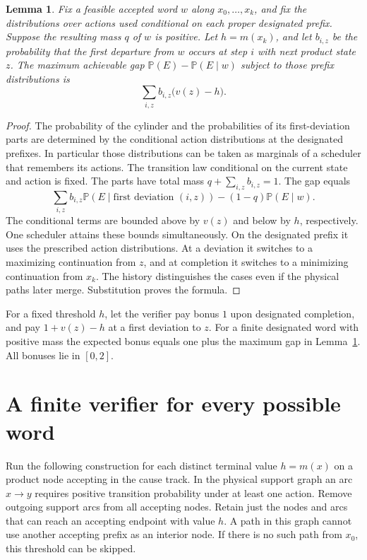 \documentclass[11pt,a4paper]{amsart}
\newtheorem{lemma}[theorem]{Lemma}
\newcommand{\Prb}{\mathbb P}
\begin{document}
\begin{lemma}\label{lem:gap}
Fix a feasible accepted word $w$ along $x_0,\ldots,x_k$, and fix the distributions over actions used conditional on each proper designated prefix. Suppose the resulting mass $q$ of $w$ is positive. Let $h=m(x_k)$, and let $b_{i,z}$ be the probability that the first departure from $w$ occurs at step $i$ with next product state $z$. The maximum achievable gap $\Prb(E)-\Prb(E\mid w)$ subject to those prefix distributions is
\[
                   \sum_{i,z} b_{i,z}\bigl(v(z)-h\bigr).
\]
\end{lemma}
\begin{proof}
The probability of the cylinder and the probabilities of its first-deviation parts are determined by the conditional action distributions at the designated prefixes. In particular those distributions can be taken as marginals of a scheduler that remembers its actions. The transition law conditional on the current state and action is fixed. The parts have total mass $q+\sum_{i,z}b_{i,z}=1$. The gap equals
\[
  \sum_{i,z} b_{i,z}\Prb(E\mid\text{first deviation }(i,z))
       -(1-q)\Prb(E\mid w).
\]
The conditional terms are bounded above by $v(z)$ and below by $h$, respectively. One scheduler attains these bounds simultaneously. On the designated prefix it uses the prescribed action distributions. At a deviation it switches to a maximizing continuation from $z$, and at completion it switches to a minimizing continuation from $x_k$. The history distinguishes the cases even if the physical paths later merge. Substitution proves the formula.
\end{proof}

For a fixed threshold $h$, let the verifier pay bonus $1$ upon designated completion, and pay $1+v(z)-h$ at a first deviation to $z$. For a finite designated word with positive mass the expected bonus equals one plus the maximum gap in Lemma~\ref{lem:gap}. All bonuses lie in $[0,2]$.

\section{A finite verifier for every possible word}
Run the following construction for each distinct terminal value $h=m(x)$ on a product node accepting in the cause track. In the physical support graph an arc $x\to y$ requires positive transition probability under at least one action. Remove outgoing support arcs from all accepting nodes. Retain just the nodes and arcs that can reach an accepting endpoint with value $h$. A path in this graph cannot use another accepting prefix as an interior node. If there is no such path from $x_0$, this threshold can be skipped.
\end{document}
